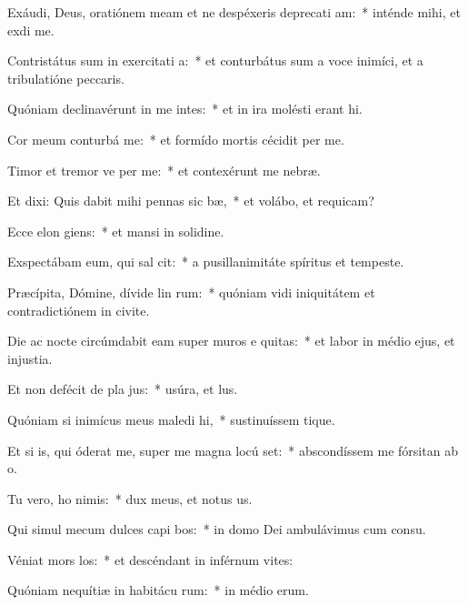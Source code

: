 \item Exáudi, Deus, oratiónem meam et ne despéxeris deprecati am:~* inténde mihi, et exdi me.
\item Contristátus sum in exercitati a:~* et conturbátus sum a voce inimíci, et a tribulatióne peccaris.
\item Quóniam declinavérunt in me intes:~* et in ira molésti erant hi.
\item Cor meum conturbá   me:~* et formído mortis cécidit per me.
\item Timor et tremor ve per me:~* et contexérunt me nebræ.
\item Et dixi: Quis dabit mihi pennas sic bæ,~* et volábo, et requicam?
\item Ecce elon giens:~* et mansi in solidine.
\item Exspectábam eum, qui sal  cit:~* a pusillanimitáte spíritus et tempeste.
\item Præcípita, Dómine, dívide lin rum:~* quóniam vidi iniquitátem et contradictiónem in civite.
\item Die ac nocte circúmdabit eam super muros e quitas:~* et labor in médio ejus, et injustia.
\item Et non defécit de pla jus:~* usúra, et lus.
\item Quóniam si inimícus meus maledi hi,~* sustinuíssem tique.
\item Et si is, qui óderat me, super me magna locú set:~* abscondíssem me fórsitan ab o.
\item Tu vero, ho nimis:~* dux meus, et notus us.
\item Qui simul mecum dulces capi bos:~* in domo Dei ambulávimus cum consu.
\item Véniat mors  los:~* et descéndant in inférnum vites:
\item Quóniam nequítiæ in habitácu rum:~* in médio erum.
